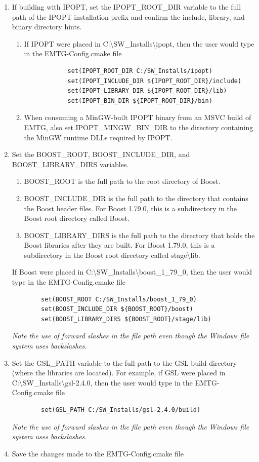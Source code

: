 \begin{enumerate}
\begin{enumerate}
		\emph{Note the use of forward slashes in the file path even though the Windows file system uses backslashes.}
	\end{enumerate}
	\item If building with \ac{IPOPT}, set the IPOPT\_ROOT\_DIR variable to the full path of the \ac{IPOPT} installation prefix and confirm the include, library, and binary directory hints.
	\begin{enumerate}
		\item If \ac{IPOPT} were placed in C:\textbackslash SW\_Installs\textbackslash ipopt, then the user would type in the EMTG-Config.cmake file \\
		\begin{verbatim}
			set(IPOPT_ROOT_DIR C:/SW_Installs/ipopt)
			set(IPOPT_INCLUDE_DIR ${IPOPT_ROOT_DIR}/include)
			set(IPOPT_LIBRARY_DIR ${IPOPT_ROOT_DIR}/lib)
			set(IPOPT_BIN_DIR ${IPOPT_ROOT_DIR}/bin)
		\end{verbatim}
		\item When consuming a MinGW-built \ac{IPOPT} binary from an \ac{MSVC} build of EMTG, also set IPOPT\_MINGW\_BIN\_DIR to the directory containing the MinGW runtime DLLs required by \ac{IPOPT}.
	\end{enumerate}
	\item Set the BOOST\_ROOT, BOOST\_INCLUDE\_DIR, and BOOST\_LIBRARY\_DIRS variables.
	\begin{enumerate}
		\item BOOST\_ROOT is the full path to the root directory of Boost.
		\item BOOST\_INCLUDE\_DIR is the full path to the directory that contains the Boost header files. For Boost 1.79.0, this is a subdirectory in the Boost root directory called Boost.
		\item BOOST\_LIBRARY\_DIRS is the full path to the directory that holds the Boost libraries after they are built. For Boost 1.79.0, this is a subdirectory in the Boost root directory called stage\textbackslash lib.
	\end{enumerate}
	If Boost were placed in C:\textbackslash SW\_Installs\textbackslash boost\_1\_79\_0, then the user would type in the EMTG-Config.cmake file 
	\begin{verbatim}
		set(BOOST_ROOT C:/SW_Installs/boost_1_79_0) 
		set(BOOST_INCLUDE_DIR ${BOOST_ROOT}/boost) 
		set(BOOST_LIBRARY_DIRS ${BOOST_ROOT}/stage/lib) 
	\end{verbatim}	
	\emph{Note the use of forward slashes in the file path even though the Windows file system uses backslashes.}
	\item Set the GSL\_PATH variable to the full path to the GSL build directory (where the libraries are located). For example, if GSL were placed in C:\textbackslash SW\_Installs\textbackslash gsl-2.4.0, then the user would type in the EMTG-Config.cmake file 
	\begin{verbatim}
		set(GSL_PATH C:/SW_Installs/gsl-2.4.0/build)
	\end{verbatim}
	\emph{Note the use of forward slashes in the file path even though the Windows file system uses backslashes.}
	\item Save the changes made to the EMTG-Config.cmake file
\end{enumerate}
